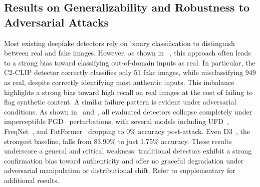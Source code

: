 \subsection{Results on Generalizability and Robustness to Adversarial Attacks}
 Most existing deepfake detectors rely on binary classification to distinguish between real and fake images. However, as shown in ~, this approach often leads to a strong bias toward classifying out-of-domain inputs as real. In particular, the C2-CLIP detector correctly classifies only 51 fake images, while misclassifying 949 as real, despite correctly identifying most authentic inputs. This imbalance highlights a strong bias toward high recall on real images at the cost of failing to flag synthetic content. A similar failure pattern is evident under adversarial conditions. As shown in~ and~, all evaluated detectors collapse completely under imperceptible PGD~\cite{pgd} perturbations, with several models including UFD~\cite{ojha2023towards}, FreqNet~\cite{Tan_Zhao_Wei_Gu_Liu_Wei_2024}, and FatFormer~\cite{fatformer} dropping to 0\% accuracy post-attack. Even D3~\cite{d3}, the strongest baseline, falls from 83.90\% to just 1.75\% accuracy. These results underscore a general and critical weakness: traditional detectors exhibit a strong confirmation bias toward authenticity and offer no graceful degradation under adversarial manipulation or distributional shift. Refer to supplementary for additional results.
